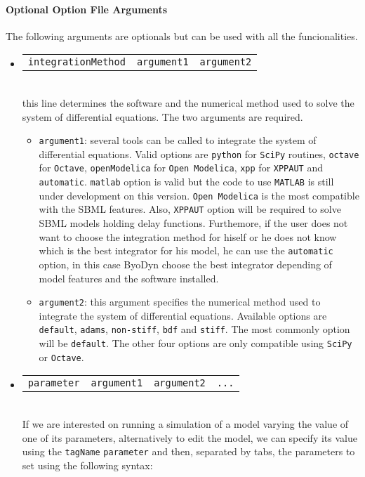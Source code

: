 \documentclass[a4paper, 11pt]{article}
\begin{document}
\paragraph{Optional Option File Arguments} \label{oofa}
The following arguments are optionals but can be used with all the funcionalities.
\begin{itemize}
\item
  \begin{tabular}{ccc}
    \texttt{integrationMethod}&\texttt{argument1}&\texttt{argument2}
  \end{tabular}\\[1.5ex]
  this line determines the software and the numerical method used to solve the system of differential equations.
  The two arguments are required.
  \begin{itemize}
  \item \texttt{argument1}: several tools can be called to integrate the system of differential equations. 
    Valid options are \texttt{python} for \texttt{SciPy} routines,
    \texttt{octave} for \texttt{Octave}, \texttt{openModelica} for \texttt{Open
    Modelica}, \texttt{xpp} for \texttt{XPPAUT} and \texttt{automatic}. 
    \texttt{matlab} option is valid but the code to use \texttt{MATLAB} is still under development on this version. \texttt{Open Modelica} is the most compatible with the SBML features. 
    Also, \texttt{XPPAUT} option will be required to solve SBML models holding
    delay functions. 
    Furthemore, if the user does not want to choose the
    integration method for hiself or he does not know which is the best
    integrator for his model, he can use the \texttt{automatic} option, in this
    case ByoDyn choose the best integrator depending of model features and the
    software installed.
  \item \texttt{argument2}: this argument specifies the numerical method used to integrate the system of differential equations.
    Available options are \texttt{default}, \texttt{adams}, \texttt{non-stiff}, \texttt{bdf} and \texttt{stiff}.
    The most commonly option will be \texttt{default}.
    The other four options are only compatible using \texttt{SciPy} or \texttt{Octave}.
  \end{itemize}
\item 
  \begin{tabular}{cccc}\texttt{parameter}&\texttt{argument1}&\texttt{argument2}&\texttt{...}\end{tabular}\\[1.5ex]
  If we are interested on running a simulation of a model varying the value of one of its parameters, alternatively to edit the model, we can specify its value using the \texttt{tagName} \texttt{parameter} and then, separated by tabs, the parameters to set using the following syntax:\\[1.5ex]

\end{itemize}
\end{document}
